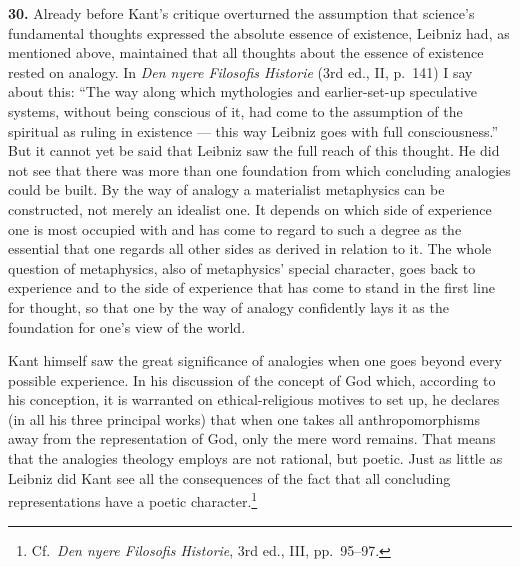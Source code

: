 \documentclass[12pt]{book}
\newcommand{\hnum}[1]{\textbf{#1.}\enspace}
\newcommand{\opage}[1]{\marginnote{\footnotesize\textit{[#1]}}}
\begin{document}
\hnum{30} Already before Kant's critique overturned the assumption that science's fundamental thoughts expressed the
absolute essence of existence, Leibniz had, as mentioned above, maintained that all thoughts about the essence of
existence rested on analogy. In \textit{Den nyere Filosofis Historie} (3rd ed., II, p.\ 141) I say about this: ``The
way along which mythologies and earlier-set-up speculative systems, without being conscious of it, had come to the
assumption of the spiritual as ruling in existence --- this way Leibniz goes with full consciousness.'' But it cannot
yet be said that Leibniz saw the full reach of this thought. He did not see that there was more than one foundation
from which concluding analogies could be built. By the way of analogy a materialist metaphysics can be constructed,
not merely an idealist one. It depends on which side of experience one is most occupied with and has come to regard
to such a degree as the essential that one regards all other sides as derived in relation to it. The whole question of
metaphysics, also of metaphysics' special character, goes back to experience and to the side of experience that has
come to stand in the first line for thought, so that one by the way of analogy confidently lays it as the foundation
for one's view of the world.

\opage{97}Kant himself saw the great significance of analogies when one goes beyond every possible experience. In his discussion
of the concept of God which, according to his conception, it is warranted on ethical-religious motives to set up, he
declares (in all his three principal works) that when one takes all anthropomorphisms away from the representation of
God, only the mere word remains. That means that the analogies theology employs are not rational, but poetic. Just as
little as Leibniz did Kant see all the consequences of the fact that all concluding representations have a poetic
character.\footnote{Cf.\ \textit{Den nyere Filosofis Historie}, 3rd ed., III, pp.\ 95--97.}
\end{document}
